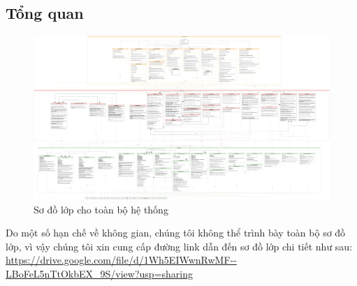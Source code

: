 \subsection{Tổng quan}
\begin{figure}[H]
    \centering
    \includegraphics[width=\linewidth]{Content/Phân tích và thiết kế hệ thống/documents/Sơ đồ lớp/images/LayerArchitect2.png}
    \vspace{0.5cm}
    \caption{Sơ đồ lớp cho toàn bộ hệ thống}
    \label{fig:Sơ đồ lớp cho toàn bộ hệ thống}
\end{figure}

\par
Do một số hạn chế về không gian, chúng tôi không thể trình bày toàn bộ sơ đồ lớp,
vì vậy chúng tôi xin cung cấp đường link dẫn đến sơ đồ lớp chi tiết như sau:
\url{https://drive.google.com/file/d/1Wh5EIWwnRwMF--LBoFeL5nTtOkbEX_9S/view?usp=sharing}